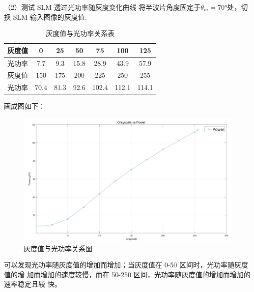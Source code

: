 \documentclass[11pt,a4paper]{article}
\begin{document}
（2）测试 SLM 透过光功率随灰度变化曲线
将半波片角度固定于$\theta_m=70°$处，切换 SLM 输入图像的灰度值:
\begin{table}[H]
    \centering
    \begin{tabular}{|c|c|c|c|c|c|c|}
    \hline
    灰度值 & 0 & 25 & 50 & 75 & 100 & 125 \\
    \hline
    光功率 & 7.7 & 9.3 & 15.8 & 28.9 & 43.9 & 57.9 \\
    \hline
    灰度值 & 150 & 175 & 200 & 225 & 250 & 255 \\
    \hline
    光功率 & 70.4 & 81.3 & 92.6 & 102.4 & 112.1 & 114.1 \\
    \hline
    \end{tabular}
    \caption{灰度值与光功率关系表}
    \label{tab:gray-power-relation}
    \end{table}
画成图如下：
    \begin{figure}[H]
        \centering
        \includegraphics[width=\textwidth]{灰度值-光功率图.png}
        \caption{灰度值与光功率关系图}
        \label{fig:gray-power-relation}
        \end{figure}
        可以发现光功率随灰度值的增加而增加；当灰度值在 0-50 区间时，光功率随灰度值的增
        加而增加的速度较慢，而在 50-250 区间，光功率随灰度值的增加而增加的速率稳定且较
        快。
\end{document}
